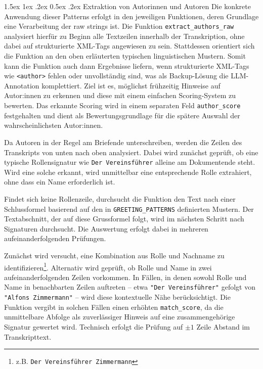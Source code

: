\documentclass[12pt, a4paper, ngerman, bidi=default]{article}
\makeatletter
\newcommand{\code}[1]{\colorbox{VeryLightGray}{\texttt{#1}}} %
\let\oldparagraph\paragraph%
\renewcommand{\paragraph}{
    \@ifstar%
      \xxxParagraphStar%
      \xxxParagraphNoStar%
 }
\newcommand{\xxxParagraphStar}[1]{\oldparagraph*{#1}\mbox{}}
\newcommand{\xxxParagraphNoStar}[1]{\oldparagraph{#1}\mbox{}}
\renewcommand\paragraph{\@startsection{paragraph}{4}{0em}%
  {1.5ex \@plus1ex \@minus.2ex}%
  {0.5ex \@plus.2ex}%
  {\normalfont\normalsize\bfseries\itshape}}
\makeatother
\begin{document}
\paragraph{Extraktion von Autorinnen und Autoren}
Die konkrete Anwendung dieser Patterns erfolgt in den jeweiligen Funktionen, deren Grundlage eine Verarbeitung der raw strings ist. Die Funktion \code{extract\_authors\_raw} analysiert hierfür zu Beginn alle Textzeilen innerhalb der Transkription, ohne dabei auf strukturierte XML-Tags angewiesen zu sein. Stattdessen orientiert sich die Funktion an den oben erläuterten typischen linguistischen Mustern. Somit kann die Funktion auch dann Ergebnisse liefern, wenn strukturierte XML-Tags wie \code{<author>} fehlen oder unvollständig sind, was als Backup-Lösung die LLM-Annotation komplettiert. Ziel ist es, möglichst frühzeitig Hinweise auf Autor:innen zu erkennen und diese mit einem einfachen Scoring-System zu bewerten. Das erkannte Scoring wird in einem separaten Feld \code{author\_score} festgehalten und dient als Bewertungsgrundlage für die spätere Auswahl der wahrscheinlichsten Autor:innen.

Da Autoren in der Regel am Briefende unterschreiben, werden die Zeilen des Transkripts von unten nach oben analysiert. Dabei wird zunächst geprüft, ob eine typische Rollensignatur wie \texttt{Der Vereinsführer} alleine am Dokumentende steht. Wird eine solche erkannt, wird unmittelbar eine entsprechende Rolle extrahiert, ohne dass ein Name erforderlich ist.

Findet sich keine Rollenzeile, durchsucht die Funktion den Text nach einer Schlussformel basierend auf den in \code{GREETING\_PATTERNS} definierten Mustern. Der Textabschnitt, der auf diese Grussformel folgt, wird im nächsten Schritt nach Signaturen durchsucht. Die Auswertung erfolgt dabei in mehreren aufeinanderfolgenden Prüfungen.

Zunächst wird versucht, eine Kombination aus Rolle und Nachname zu identifizieren\footnote{z.B. \texttt{Der Vereinsführer Zimmermann}}.
Alternativ wird geprüft, ob Rolle und Name in zwei aufeinanderfolgenden Zeilen vorkommen. In Fällen, in denen sowohl Rolle und Name in benachbarten Zeilen auftreten – etwa \texttt{"Der Vereinsführer"} gefolgt von \texttt{"Alfons Zimmermann"} – wird diese kontextuelle Nähe berücksichtigt. Die Funktion vergibt in solchen Fällen einen erhöhten \code{match\_score}, da die unmittelbare Abfolge als zuverlässiger Hinweis auf eine zusammengehörige Signatur gewertet wird. Technisch erfolgt die Prüfung auf $\pm1$ Zeile Abstand im Transkripttext.\\
\end{document}
